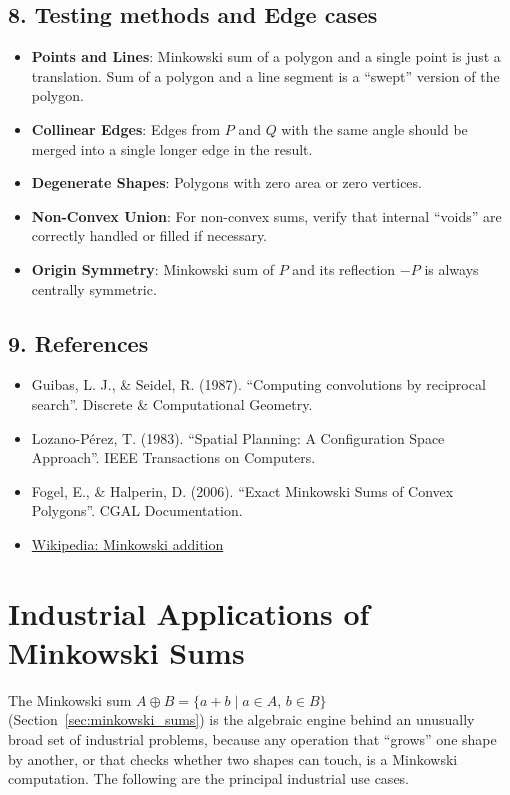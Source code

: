 \subsection{8. Testing methods and Edge cases}
\begin{itemize}
    \item \textbf{Points and Lines}: Minkowski sum of a polygon and a single point is just a translation. Sum of a polygon and a line segment is a ``swept'' version of the polygon.
    \item \textbf{Collinear Edges}: Edges from $P$ and $Q$ with the same angle should be merged into a single longer edge in the result.
    \item \textbf{Degenerate Shapes}: Polygons with zero area or zero vertices.
    \item \textbf{Non-Convex Union}: For non-convex sums, verify that internal ``voids'' are correctly handled or filled if necessary.
    \item \textbf{Origin Symmetry}: Minkowski sum of $P$ and its reflection $-P$ is always centrally symmetric.
\end{itemize}

\subsection{9. References}
\begin{itemize}
    \item Guibas, L. J., \& Seidel, R. (1987). ``Computing convolutions by reciprocal search''. Discrete \& Computational Geometry.
    \item Lozano-P\'{e}rez, T. (1983). ``Spatial Planning: A Configuration Space Approach''. IEEE Transactions on Computers.
    \item Fogel, E., \& Halperin, D. (2006). ``Exact Minkowski Sums of Convex Polygons''. CGAL Documentation.
    \item \href{https://en.wikipedia.org/wiki/Minkowski_addition}{Wikipedia: Minkowski addition}
\end{itemize}

\section{Industrial Applications of Minkowski Sums}
\label{sec:minkowski_applications}

The Minkowski sum $A \oplus B = \{a + b \mid a \in A,\, b \in B\}$
(Section~\ref{sec:minkowski_sums}) is the algebraic engine behind an
unusually broad set of industrial problems, because any operation that
``grows'' one shape by another, or that checks whether two shapes can touch,
is a Minkowski computation. The following are the principal industrial use
cases.

